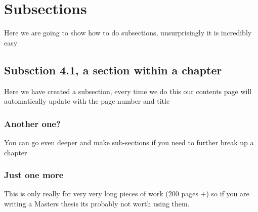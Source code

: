 \documentclass[../main.tex]{subfiles}
\begin{document}
\section{Subsections}

Here we are going to show how to do subsections, unsurprisingly it is incredibly easy

\subsection{Subsction 4.1, a section within a chapter}
Here we have created a subsection, every time we do this our contents page will automatically update with the page number and title

\subsubsection{Another one?}
You can go even deeper and make sub-sections if you need to further break up a chapter
\subsubsection{Just one more}
This is only really for very very long pieces of work (200 pages +) so if you are writing a Masters thesis its probably not worth using them.
\end{document}
